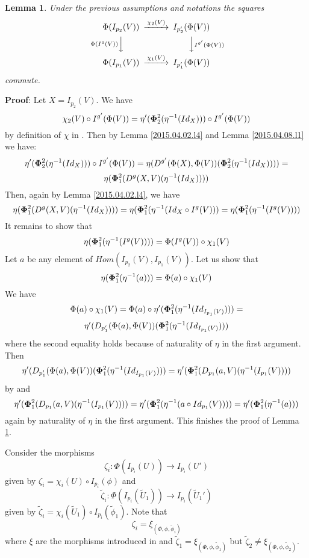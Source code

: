 \documentclass[12pt]{article}
\newenvironment{myproof}{{\bf Proof}:}{\vskip 5mm }
\newtheorem{lemma}[proposition]{Lemma}
\newcommand{\llabel}[1]{\label{#1}}
\newcommand{\sr}{\rightarrow}
\newcommand{\wt}{\widetilde}
\begin{document}
%
\begin{lemma}
\llabel{2015.04.06.l7}
Under the previous assumptions and notations the squares
%
$$
\begin{CD}
\Phi(I_{p_2}(V)) @>\chi_2(V)>> I_{p_2'}(\Phi(V))\\
@V{\Phi(I^g(V))} VV @VV {I^{g'}(\Phi(V))} V\\
\Phi(I_{p_1}(V)) @>\chi_1(V)>> I_{p_1'}(\Phi(V))
\end{CD}
$$
%
commute.
\end{lemma}
%
\begin{myproof}
Let $X=I_{p_2}(V)$. We have
%
$$\chi_2(V)\circ {I^{g'}(\Phi(V))}=\eta'({\bf\Phi}_2^2(\eta^{-1}(Id_{X})))\circ I^{g'}(\Phi(V))$$
%
by definition of $\chi$ in \cite[Construction 5.6]{fromunivwithPi}. Then by Lemma \ref{2015.04.02.l4}  and Lemma \ref{2015.04.08.l1} we have:
%
$$\eta'({\bf\Phi}_2^2(\eta^{-1}(Id_{X})))\circ I^{g'}(\Phi(V))=\eta(D^{g'}(\Phi(X),\Phi(V))({\bf\Phi}_2^2(\eta^{-1}(Id_X))))=$$$$\eta({\bf\Phi}_1^2(D^g(X,V)(\eta^{-1}(Id_X))))$$
%
Then, again by Lemma \ref{2015.04.02.l4},   we have
%
$$\eta({\bf\Phi}_1^2(D^g(X,V)(\eta^{-1}(Id_X))))=\eta({\bf\Phi}_1^2(\eta^{-1}(Id_X\circ I^g(V)))=\eta({\bf\Phi}_1^2(\eta^{-1}(I^g(V))))$$
%
It remains to show that
%
$$\eta({\bf\Phi}_1^2(\eta^{-1}(I^g(V))))=\Phi(I^g(V))\circ \chi_1(V)$$
%
Let $a$ be any element of $Hom(I_{p_2}(V),I_{p_1}(V))$. Let us show that
%
$$\eta({\bf\Phi}_1^2(\eta^{-1}(a)))=\Phi(a)\circ \chi_1(V)$$
%
We have
%
$$\Phi(a)\circ \chi_1(V)=\Phi(a)\circ \eta'({\bf\Phi}^2_1(\eta^{-1}(Id_{I_{p_1}(V)})))=$$$$\eta'(D_{p_1'}(\Phi(a),\Phi(V))({\bf\Phi}^2_1(\eta^{-1}(Id_{I_{p_1}(V)})))$$
%
where the second equality holds because of naturality of $\eta$ in the first argument. Then 
%
$$\eta'(D_{p_1'}(\Phi(a),\Phi(V))({\bf\Phi}^2_1(\eta^{-1}(Id_{I_{p_1}(V)})))=\eta'({\bf\Phi}^2_1(D_{p_1}(a,V)(\eta^{-1}(I_{p_1}(V))))$$
%
by \cite[Lemma 5.4]{fromunivwithPi} and 
%
$$\eta'({\bf\Phi}^2_1(D_{p_1}(a,V)(\eta^{-1}(I_{p_1}(V))))=\eta'({\bf\Phi}^2_1(\eta^{-1}(a\circ Id_{p_1}(V))))=\eta'({\bf\Phi}_1^2(\eta^{-1}(a)))$$
%
again by naturality of $\eta$ in the first argument. This finishes the proof of Lemma \ref{2015.04.06.l7}.
\end{myproof}




Consider the morphisms
%
$$\zeta_i:\Phi(I_{p_i}(U))\sr I_{p_i}(U')$$
%
given by $\zeta_i=\chi_i(U)\circ I_{p_i}(\phi)$ and
%
$$\wt{\zeta}_i:\Phi(I_{p_i}(\wt{U}_1))\sr I_{p_i}(\wt{U}_1')$$
%
given by $\wt{\zeta}_i=\chi_i(\wt{U}_1)\circ I_{p_i}(\wt{\phi}_1)$. Note that 
%
$$\zeta_i=\xi_{(\Phi,\phi,\wt{\phi}_i)}$$
%
where $\xi$ are the morphisms introduced in \cite{fromunivwithPi} and $\wt{\zeta}_1=\xi_{(\Phi,\phi,\wt{\phi}_1)}$ but $\wt{\zeta}_2\ne \xi_{(\Phi,\phi,\wt{\phi}_2)}$.   
\end{document}
